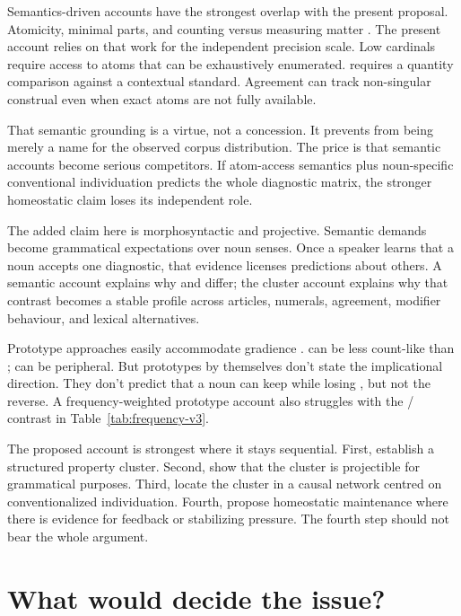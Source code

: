 \documentclass[12pt,a4paper]{article}
\begin{document}
Semantics-driven accounts have the strongest overlap with the present proposal. Atomicity, minimal parts, and counting versus measuring matter \citep{chierchia1998,rothstein2010,grimm2018}. The present account relies on that work for the independent precision scale. Low cardinals require access to atoms that can be exhaustively enumerated.  requires a quantity comparison against a contextual standard. Agreement can track non-singular construal even when exact atoms are not fully available.

That semantic grounding is a virtue, not a concession. It prevents  from being merely a name for the observed corpus distribution. The price is that semantic accounts become serious competitors. If atom-access semantics plus noun-specific conventional individuation predicts the whole diagnostic matrix, the stronger homeostatic claim loses its independent role.

The added claim here is morphosyntactic and projective. Semantic demands become grammatical expectations over noun senses. Once a speaker learns that a noun accepts one diagnostic, that evidence licenses predictions about others. A semantic account explains why  and  differ; the cluster account explains why that contrast becomes a stable profile across articles, numerals, agreement, modifier behaviour, and lexical alternatives.

Prototype approaches easily accommodate gradience \citep{taylor2003,aarts2007}.  can be less count-like than ;  can be peripheral. But prototypes by themselves don't state the implicational direction. They don't predict that a noun can keep  while losing , but not the reverse. A frequency-weighted prototype account also struggles with the / contrast in Table~\ref{tab:frequency-v3}.

The proposed account is strongest where it stays sequential. First, establish a structured property cluster. Second, show that the cluster is projectible for grammatical purposes. Third, locate the cluster in a causal network centred on conventionalized individuation. Fourth, propose homeostatic maintenance where there is evidence for feedback or stabilizing pressure. The fourth step should not bear the whole argument.

\section{What would decide the issue?}\label{sec:tests-v3}
\end{document}
